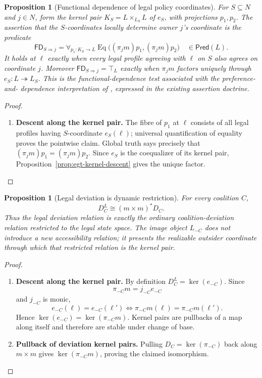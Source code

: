 \documentclass[11pt,a4paper]{article}
\numberwithin{equation}{section}
\newtheorem{proposition}[theorem]{Proposition}
\theoremstyle{definition}
\theoremstyle{remark}
\theoremstyle{plain}
\begin{document}
\begin{proposition}[Functional dependence of legal policy coordinates]
\label{prop:egt-functional-dependence}
For $S\subseteq N$ and $j\in N$, form the kernel pair
$K_S=L\times_{L_S}L$ of $e_S$, with projections $p_1,p_2$.
The assertion that the $S$-coordinates locally determine owner $j$'s
coordinate is the predicate
\[
 \mathsf{FD}_{S\Rightarrow j}
 =\forall_{p_1:K_S\to L}
   \operatorname{Eq}\bigl((\pi_jm)p_1,(\pi_jm)p_2\bigr)
 \quad\in\mathsf{Pred}(L).
\]
It holds at $\ell$ exactly when every legal profile agreeing with
$\ell$ on $S$ also agrees on coordinate $j$. Moreover
$\mathsf{FD}_{S\Rightarrow j}=\top_L$ exactly when $\pi_jm$ factors
uniquely through $e_S:L\twoheadrightarrow L_S$.
This is the functional-dependence test associated with the preference-and-
dependence interpretation of \citet{ChenShiWang2022}, expressed in
the existing assertion doctrine.
\end{proposition}
\begin{proof}
\leavevmode
\begin{enumerate}[label=\textup{(\arabic*)},leftmargin=*,itemsep=4pt,topsep=3pt]
  \item \textbf{Descent along the kernel pair.} The fibre of $p_1$ at $\ell$ consists of all legal profiles having
$S$-coordinate $e_S(\ell)$; universal quantification of equality proves
the pointwise claim. Global truth says precisely that
$(\pi_jm)p_1=(\pi_jm)p_2$. Since $e_S$ is the coequalizer of its kernel
pair, Proposition~\ref{prop:egt-kernel-descent} gives the unique factor.
\end{enumerate}
\end{proof}

\begin{proposition}[Legal deviation is dynamic restriction]
\label{prop:egt-legal-deviation-restriction}
For every coalition $C$,
\begin{equation}
\label{eq:egt-legal-deviation-restriction}
 D_C^L\cong(m\times m)^*D_C.
\end{equation}
Thus the legal deviation relation is exactly the ordinary coalition-deviation
relation restricted to the legal state space. The image object $L_{-C}$ does
not introduce a new accessibility relation; it presents the realizable
outsider coordinate through which that restricted relation is the kernel pair.
\end{proposition}
\begin{proof}
\leavevmode
\begin{enumerate}[label=\textup{(\arabic*)},leftmargin=*,itemsep=4pt,topsep=3pt]
  \item \textbf{Descent along the kernel pair.} By definition
$D_C^L=\ker(e_{-C})$. Since
\[
 \pi_{-C}m=j_{-C}e_{-C}
\]
and $j_{-C}$ is monic,
\[
 e_{-C}(\ell)=e_{-C}(\ell')
 \Longleftrightarrow
 \pi_{-C}m(\ell)=\pi_{-C}m(\ell').
\]
Hence
$\ker(e_{-C})=\ker(\pi_{-C}m)$. Kernel pairs are pullbacks of a map along
itself and therefore are stable under change of base.
  \item \textbf{Pullback of deviation kernel pairs.} Pulling
$D_C=\ker(\pi_{-C})$ back along $m\times m$ gives
$\ker(\pi_{-C}m)$, proving the claimed isomorphism.
\end{enumerate}
\end{proof}
\end{document}
